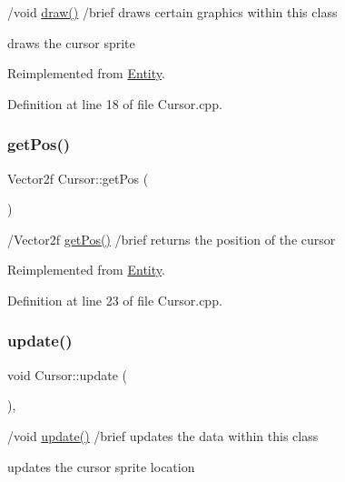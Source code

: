 /void \hyperlink{class_cursor_a31c09a077d14237953223980197fdd17}{draw()} /brief draws certain graphics within this class
\begin{DoxyItemize}
\item draws the cursor sprite 
\end{DoxyItemize}

Reimplemented from \hyperlink{class_entity_a030c3aa6641df7981a2d8a3fba890ec7}{Entity}.



Definition at line 18 of file Cursor.\+cpp.

\mbox{\label{class_cursor_a214e135fad5e686f5bcfea34806c8730}} 
\subsubsection{\texorpdfstring{get\+Pos()}{getPos()}}
{\footnotesize\ttfamily Vector2f Cursor\+::get\+Pos (\begin{DoxyParamCaption}{ }\end{DoxyParamCaption})\hspace{0.3cm}{\ttfamily [virtual]}}

/\+Vector2f \hyperlink{class_cursor_a214e135fad5e686f5bcfea34806c8730}{get\+Pos()} /brief returns the position of the cursor 

Reimplemented from \hyperlink{class_entity_a8b6080f0ab76702fcd00108aef8ea9dd}{Entity}.



Definition at line 23 of file Cursor.\+cpp.

\mbox{\label{class_cursor_a2450501ae27244acb089209436d5b112}} 
\subsubsection{\texorpdfstring{update()}{update()}}
{\footnotesize\ttfamily void Cursor\+::update (\begin{DoxyParamCaption}{ }\end{DoxyParamCaption})\hspace{0.3cm}{\ttfamily [override]}, {\ttfamily [virtual]}}

/void \hyperlink{class_cursor_a2450501ae27244acb089209436d5b112}{update()} /brief updates the data within this class
\begin{DoxyItemize}
\item updates the cursor sprite location 
\end{DoxyItemize}

